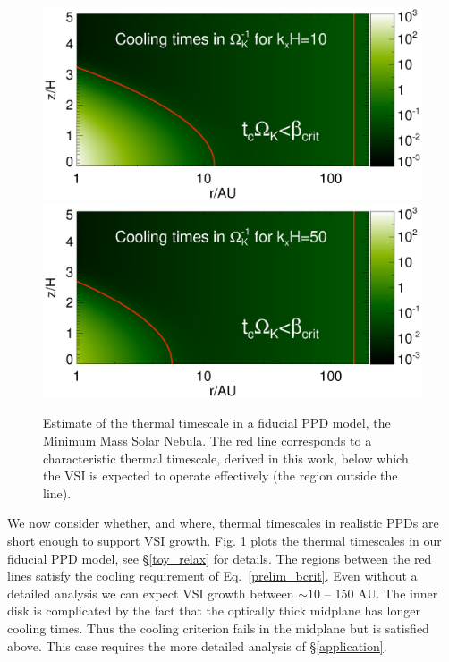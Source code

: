 \documentclass[iop, numberedappendix]{emulateapj}
\begin{document}
\begin{figure}
  \includegraphics[width=\linewidth,clip=true,trim=0cm 1.7cm 0cm
  0.73cm]{figures/bcrit_mmsn2d_kx10}
  \includegraphics[width=\linewidth,clip=true,trim=0cm 0.46cm 0cm
  0.73cm]{figures/bcrit_mmsn2d_kx50}
  \caption{Estimate of the thermal timescale  in a fiducial 
    PPD model, the Minimum Mass Solar Nebula. The red
    line corresponds to a characteristic thermal timescale, derived in
    this work, below which the VSI is expected to operate effectively
    (the region outside the line).    
    \label{bcrit_mmsn2d} 
  }
\end{figure}

We now consider whether, and where, thermal timescales in realistic PPDs
are short enough to support VSI growth.  Fig. \ref{bcrit_mmsn2d} plots the
 thermal timescales in our fiducial PPD model, see \S\ref{toy_relax} for details.
 The regions between the red lines satisfy the cooling requirement of Eq.\ \ref{prelim_bcrit}.
 Even without a detailed analysis we can expect VSI growth between $\sim 10$ -- 150 AU.
 The inner disk is complicated by the fact that the optically thick midplane has longer cooling times. 
 Thus the cooling criterion fails in the midplane but is satisfied above.  This case requires the 
 more detailed analysis of \S\ref{application}.
 
\end{document}
